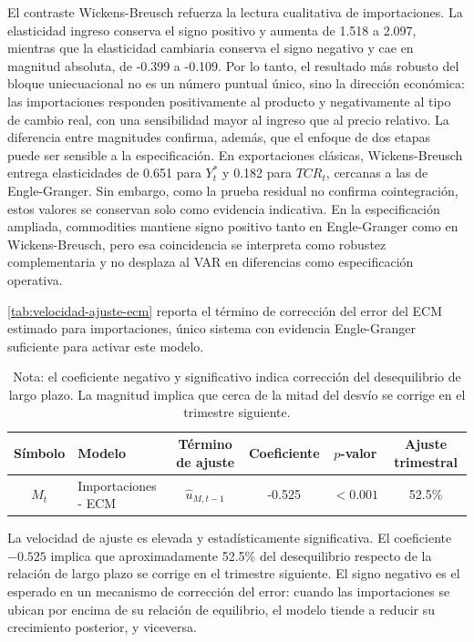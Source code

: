 \documentclass[11pt,a4paper]{article}
\begin{document}
	El contraste Wickens-Breusch refuerza la lectura cualitativa de importaciones.
	La elasticidad ingreso conserva el signo positivo y aumenta de 1.518 a 2.097,
	mientras que la elasticidad cambiaria conserva el signo negativo y cae en
	magnitud absoluta, de -0.399 a -0.109. Por lo tanto, el resultado más robusto
	del bloque uniecuacional no es un número puntual único, sino la dirección
	económica: las importaciones responden positivamente al producto y
	negativamente al tipo de cambio real, con una sensibilidad mayor al ingreso que
	al precio relativo. La diferencia entre magnitudes confirma, además, que el
	enfoque de dos etapas puede ser sensible a la especificación. En exportaciones
	clásicas, Wickens-Breusch entrega elasticidades de 0.651 para \(Y_t^*\) y 0.182
	para \(TCR_t\), cercanas a las de Engle-Granger. Sin embargo, como la prueba
	residual no confirma cointegración, estos valores se conservan solo como
	evidencia indicativa. En la especificación ampliada, commodities mantiene signo
	positivo tanto en Engle-Granger como en Wickens-Breusch, pero esa coincidencia
	se interpreta como robustez complementaria y no desplaza al VAR en diferencias
	como especificación operativa.
	
	\autoref{tab:velocidad-ajuste-ecm} reporta el término de corrección del error
	del ECM estimado para importaciones, único sistema con evidencia Engle-Granger
	suficiente para activar este modelo.
	
	\begin{table}[H]
		\centering
		\caption{Velocidad de ajuste del ECM de importaciones.}
		\label{tab:velocidad-ajuste-ecm}
		\small
		\begin{tabular}{clcccc}
			\toprule
			Símbolo & Modelo & Término de ajuste & Coeficiente & \(p\)-valor & Ajuste trimestral \\
			\midrule
			\(M_t\) & Importaciones - ECM & \(\hat{u}_{M,t-1}\) & -0.525 & \(<0.001\) & 52.5\% \\
			\bottomrule
		\end{tabular}
		\caption*{\footnotesize Nota: el coeficiente negativo y significativo indica
			corrección del desequilibrio de largo plazo. La magnitud implica que cerca de
			la mitad del desvío se corrige en el trimestre siguiente.}
	\end{table}
	
	La velocidad de ajuste es elevada y estadísticamente significativa. El
	coeficiente \(-0.525\) implica que aproximadamente 52.5\% del desequilibrio
	respecto de la relación de largo plazo se corrige en el trimestre siguiente.
	El signo negativo es el esperado en un mecanismo de corrección del error:
	cuando las importaciones se ubican por encima de su relación de equilibrio, el
	modelo tiende a reducir su crecimiento posterior, y viceversa.
\end{document}
